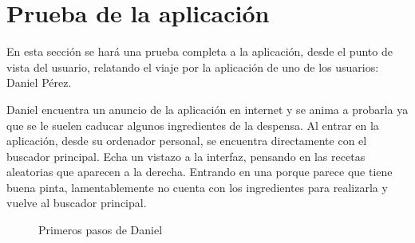 \section{Prueba de la aplicación}
En esta sección se hará una prueba completa a la aplicación, desde el punto de vista del usuario, relatando el viaje por la aplicación de uno de los usuarios: Daniel Pérez.

Daniel encuentra un anuncio de la aplicación en internet y se anima a probarla ya que se le suelen caducar algunos ingredientes de la despensa. Al entrar en la aplicación, desde su ordenador personal, se encuentra directamente con el buscador principal. Echa un vistazo a la \gls{interfaz}, pensando en las recetas aleatorias que aparecen a la derecha. Entrando en una porque parece que tiene buena pinta, lamentablemente no cuenta con los ingredientes para realizarla y vuelve al buscador principal. 

\newpage
\begin{figure}
    \centering
    \caption{Primeros pasos de Daniel}
    \label{fig:Daniel-pasos1}
\end{figure}

